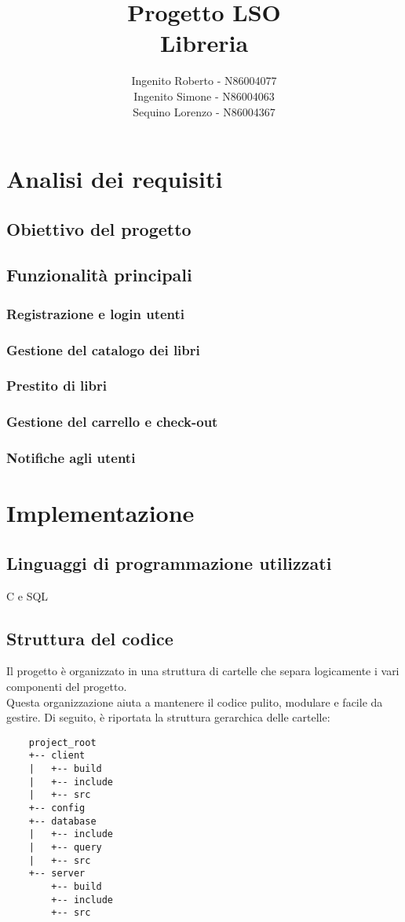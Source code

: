 \documentclass[]{report}
\title{\textbf{Progetto LSO}\\Libreria}
\author{
    Ingenito Roberto - N86004077\\
    Ingenito Simone - N86004063\\
    Sequino Lorenzo - N86004367 
   }
\date{}
\begin{document}
\maketitle

\newpage



\newpage
\chapter{Analisi dei requisiti}
\section{Obiettivo del progetto}
\section{Funzionalità principali}
\subsection{Registrazione e login utenti}
\subsection{Gestione del catalogo dei libri}
\subsection{Prestito di libri}
\subsection{Gestione del carrello e check-out}
\subsection{Notifiche agli utenti}

\chapter{Implementazione}
\section{Linguaggi di programmazione utilizzati}
C e SQL

\section{Struttura del codice}
Il progetto è organizzato in una struttura di cartelle che separa logicamente i vari componenti del progetto.\\
Questa organizzazione aiuta a mantenere il codice pulito, modulare e facile da gestire.\meskip
Di seguito, è riportata la struttura gerarchica delle cartelle:
\begin{verbatim}
    project_root
    +-- client
    |   +-- build
    |   +-- include
    |   +-- src
    +-- config
    +-- database
    |   +-- include
    |   +-- query
    |   +-- src
    +-- server
        +-- build
        +-- include
        +-- src
\end{verbatim}
\end{document}
